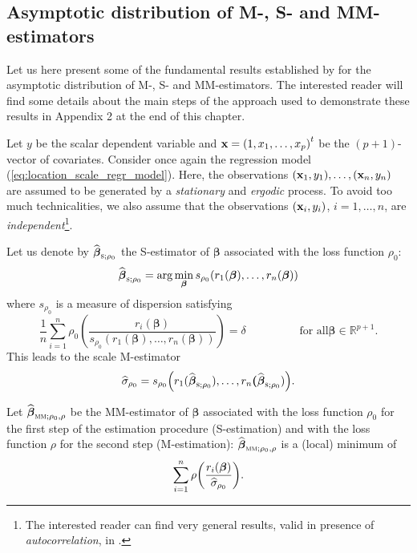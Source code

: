 \subsection{Asymptotic distribution of M-, S- and MM-estimators}
\label{subsec:asymptotic_distr_M_S_MM_estimators}

Let us here present some of the fundamental results established by \citet{Croux:2003}
for the asymptotic distribution of M-, S- and
MM-estimators. The interested reader will find some details about the main
steps of the approach used to demonstrate these results in Appendix 2 at the
end of this chapter.

Let $y$ be the scalar dependent variable and $\stvec{x}=\left(
1,x_{1},\ldots,x_{p}\right)  ^{t}$ be the $\left(  p+1\right)  $-vector of
covariates. Consider once again the regression model
(\ref{eq:location_scale_regr_model}). Here, the observations $\left(
\stvec{x}_{1},y_{1}\right)  ,\ldots,\left(  \stvec{x}_{n},y_{n}\right)  $
are assumed to be generated by a \emph{stationary} and \emph{ergodic} process.
To avoid too much technicalities, we also assume that the observations
$\left(  \stvec{x}_{i},y_{i}\right)  $, $i = 1, \dots, n$, are
\emph{independent}\footnote{The interested reader can find very general
results, valid in presence of \emph{autocorrelation}, in
\citet{Croux:2003}.}.

Let us denote by $\sthat{\boldsymbol\beta}_{\stsc{S};\rho_{0}}$ the
S-estimator of $\boldsymbol\beta$ associated with the loss function
$\rho_{0}$:%
\[
\sthat{\boldsymbol\beta}_{\stsc{S};\rho_{0}}=\arg\min_{\boldsymbol{\beta
}}s_{\rho_{0}}\left(  r_{1}\left(  \boldsymbol\beta\right)  ,\ldots
,r_{n}\left(  \boldsymbol\beta\right)  \right)
\]
where $s_{\rho_{0}}$ is a measure of dispersion satisfying%
\[
\frac{1}{n}\sum_{i=1}^{n}\rho_{0}\left(  \frac{r_{i}\left(  \boldsymbol{\beta
}\right)  }{s_{\rho_{0}}\left(  r_{1}(\boldsymbol\beta),\ldots
,r_{n}(\boldsymbol\beta)\right)  }\right)  =\delta\hspace{2cm}\text{for all
}\boldsymbol\beta\in\mathbb{R}^{p+1}.
\]
This leads to the scale M-estimator%
\[
\sthat{\sigma}_{\rho_{0}}=s_{\rho_{0}}\left(  r_{1}(\widehat
{\boldsymbol\beta}_{\stsc{S};\rho_{0}}),\ldots,r_{n}\boldsymbol{(}%
\sthat{\boldsymbol\beta}_{\stsc{S};\rho_{0}})\right)  .
\]


Let $\sthat{\boldsymbol\beta}_{\stsc{MM};\rho_{0},\rho}$ be the
MM-estimator of $\boldsymbol\beta$ associated with the loss function
$\rho_{0}$ for the first step of the estimation procedure (S-estimation) and
with the loss function $\rho$ for the second step (M-estimation):
$\sthat{\boldsymbol\beta}_{\stsc{MM};\rho_{0},\rho}$ is a (local)
minimum of
\[
\sum_{i=1}^{n}\rho\left(  \frac{r_{i}\left(  \boldsymbol\beta\right)
}{\sthat{\sigma}_{\rho_{0}}}\right)  .
\]


